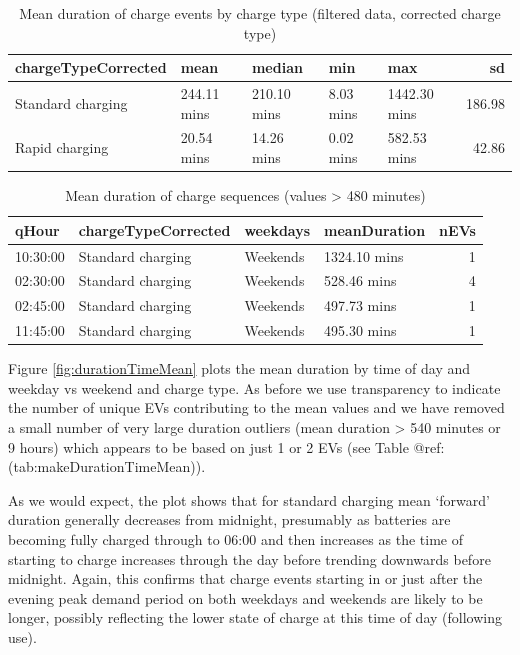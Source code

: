 \documentclass[]{article}
\begin{document}
\begin{table}[t]

\caption{\label{tab:meanDurationTable}Mean duration of charge events by charge type (filtered data, corrected charge type)}
\centering
\begin{tabular}{l|l|l|l|l|r}
\hline
chargeTypeCorrected & mean & median & min & max & sd\\
\hline
Standard charging & 244.11 mins & 210.10 mins & 8.03 mins & 1442.30 mins & 186.98\\
\hline
Rapid charging & 20.54 mins & 14.26 mins & 0.02 mins & 582.53 mins & 42.86\\
\hline
\end{tabular}
\end{table}

\begin{table}[t]

\caption{\label{tab:makeDurationTimeMean}Mean duration of charge sequences (values > 480 minutes)}
\centering
\begin{tabular}{l|l|l|l|r}
\hline
qHour & chargeTypeCorrected & weekdays & meanDuration & nEVs\\
\hline
10:30:00 & Standard charging & Weekends & 1324.10 mins & 1\\
\hline
02:30:00 & Standard charging & Weekends & 528.46 mins & 4\\
\hline
02:45:00 & Standard charging & Weekends & 497.73 mins & 1\\
\hline
11:45:00 & Standard charging & Weekends & 495.30 mins & 1\\
\hline
\end{tabular}
\end{table}

Figure \ref{fig:durationTimeMean} plots the mean duration by time of day and weekday vs weekend and charge type. As before we use transparency to indicate the number of unique EVs contributing to the mean values and we have removed a small number of very large duration outliers (mean duration \textgreater{} 540 minutes or 9 hours) which appears to be based on just 1 or 2 EVs (see Table @ref:(tab:makeDurationTimeMean)).

As we would expect, the plot shows that for standard charging mean `forward' duration generally decreases from midnight, presumably as batteries are becoming fully charged through to 06:00 and then increases as the time of starting to charge increases through the day before trending downwards before midnight. Again, this confirms that charge events starting in or just after the evening peak demand period on both weekdays and weekends are likely to be longer, possibly reflecting the lower state of charge at this time of day (following use).
\end{document}
